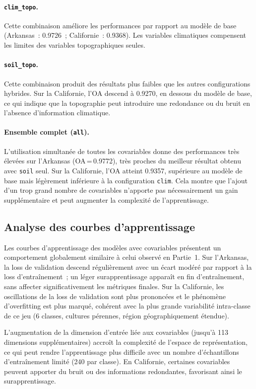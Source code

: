 \paragraph{\texttt{clim\_topo}.}
Cette combinaison améliore les performances par rapport au modèle de base
(Arkansas~: 0.9726~; Californie~: 0.9368). Les variables climatiques compensent
les limites des variables topographiques seules.

\paragraph{\texttt{soil\_topo}.}
Cette combinaison produit des résultats plus faibles que les autres configurations
hybrides. Sur la Californie, l'OA descend à 0.9270, en dessous du modèle de base,
ce qui indique que la topographie peut introduire une redondance ou du bruit en
l'absence d'information climatique.

\paragraph{Ensemble complet (\texttt{all}).}
L'utilisation simultanée de toutes les covariables donne des performances très élevées
sur l'Arkansas (OA\,=\,0.9772), très proches du meilleur résultat obtenu avec
\texttt{soil} seul. Sur la Californie, l'OA atteint 0.9357, supérieure au modèle de
base mais légèrement inférieure à la configuration \texttt{clim}. Cela montre que
l'ajout d'un trop grand nombre de covariables n'apporte pas nécessairement un gain
supplémentaire et peut augmenter la complexité de l'apprentissage.

\subsection{Analyse des courbes d'apprentissage}

Les courbes d'apprentissage des modèles avec covariables présentent un comportement
globalement similaire à celui observé en Partie~1. Sur l'Arkansas, la loss de
validation descend régulièrement avec un écart modéré par rapport à la loss
d'entraînement~; un léger surapprentissage apparaît en fin d'entraînement, sans
affecter significativement les métriques finales. Sur la Californie, les oscillations
de la loss de validation sont plus prononcées et le phénomène d'overfitting est plus
marqué, cohérent avec la plus grande variabilité intra-classe de ce jeu
(6 classes, cultures pérennes, région géographiquement étendue).

L'augmentation de la dimension d'entrée liée aux covariables (jusqu'à 113
dimensions supplémentaires) accroît la complexité de l'espace de représentation,
ce qui peut rendre l'apprentissage plus difficile avec un nombre d'échantillons
d'entraînement limité (240 par classe). En Californie, certaines covariables
peuvent apporter du bruit ou des informations redondantes, favorisant ainsi le
surapprentissage.


